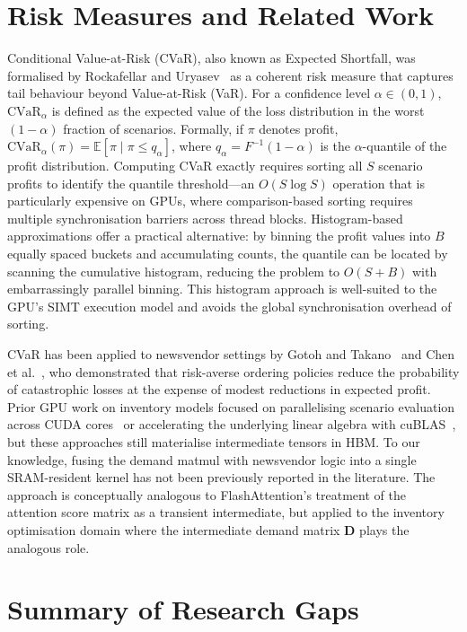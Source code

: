 \section{Risk Measures and Related Work}

Conditional Value-at-Risk (CVaR), also known as Expected Shortfall, was formalised by Rockafellar and Uryasev~\citep{rockafellar2000} as a coherent risk measure that captures tail behaviour beyond Value-at-Risk (VaR). For a confidence level $\alpha \in (0,1)$, $\text{CVaR}_\alpha$ is defined as the expected value of the loss distribution in the worst $(1-\alpha)$ fraction of scenarios. Formally, if $\pi$ denotes profit, $\text{CVaR}_\alpha(\pi) = \mathbb{E}[\pi \mid \pi \leq q_\alpha]$, where $q_\alpha = F^{-1}(1-\alpha)$ is the $\alpha$-quantile of the profit distribution. Computing CVaR exactly requires sorting all $S$ scenario profits to identify the quantile threshold---an $O(S \log S)$ operation that is particularly expensive on GPUs, where comparison-based sorting requires multiple synchronisation barriers across thread blocks. Histogram-based approximations offer a practical alternative: by binning the profit values into $B$ equally spaced buckets and accumulating counts, the quantile can be located by scanning the cumulative histogram, reducing the problem to $O(S + B)$ with embarrassingly parallel binning. This histogram approach is well-suited to the GPU's SIMT execution model and avoids the global synchronisation overhead of sorting.

CVaR has been applied to newsvendor settings by Gotoh and Takano~\citep{gotoh2007} and Chen et al.~\citep{chen2009}, who demonstrated that risk-averse ordering policies reduce the probability of catastrophic losses at the expense of modest reductions in expected profit. Prior GPU work on inventory models focused on parallelising scenario evaluation across CUDA cores~\citep{pichitlamken2012} or accelerating the underlying linear algebra with cuBLAS~\citep{munguia2019}, but these approaches still materialise intermediate tensors in HBM. To our knowledge, fusing the demand matmul with newsvendor logic into a single SRAM-resident kernel has not been previously reported in the literature. The approach is conceptually analogous to FlashAttention's treatment of the attention score matrix as a transient intermediate, but applied to the inventory optimisation domain where the intermediate demand matrix $\mathbf{D}$ plays the analogous role.

\section{Summary of Research Gaps}

